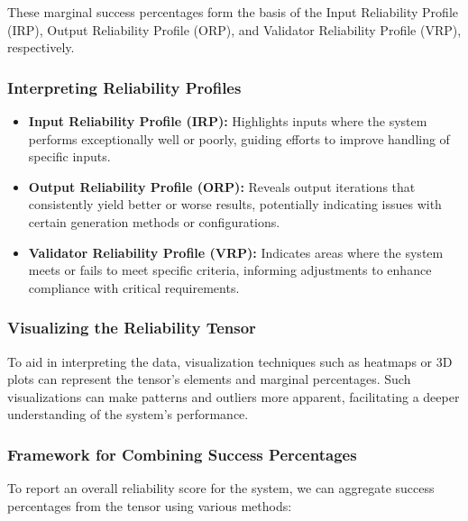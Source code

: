 \documentclass{article}
\begin{document}
These marginal success percentages form the basis of the Input Reliability Profile (IRP), Output Reliability Profile (ORP), and Validator Reliability Profile (VRP), respectively.

\subsubsection{Interpreting Reliability Profiles}

\begin{itemize}
    \item \textbf{Input Reliability Profile (IRP):} Highlights inputs where the system performs exceptionally well or poorly, guiding efforts to improve handling of specific inputs.
    \item \textbf{Output Reliability Profile (ORP):} Reveals output iterations that consistently yield better or worse results, potentially indicating issues with certain generation methods or configurations.
    \item \textbf{Validator Reliability Profile (VRP):} Indicates areas where the system meets or fails to meet specific criteria, informing adjustments to enhance compliance with critical requirements.
\end{itemize}

\subsubsection{Visualizing the Reliability Tensor}

To aid in interpreting the data, visualization techniques such as heatmaps or 3D plots can represent the tensor's elements and marginal percentages. Such visualizations can make patterns and outliers more apparent, facilitating a deeper understanding of the system's performance.

\subsubsection{Framework for Combining Success Percentages}

To report an overall reliability score for the system, we can aggregate success percentages from the tensor using various methods:
\end{document}
